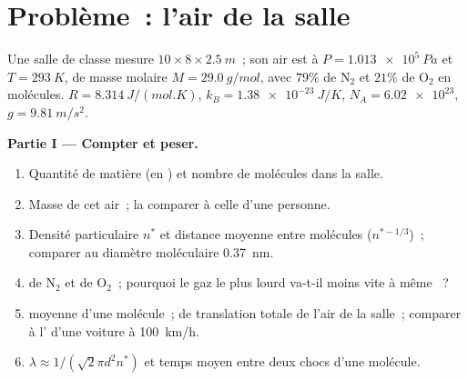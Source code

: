 \section{Problème~: l'air de la salle}

\begin{problem}
\label{pb:b1:kinetic-theory:1}
Une salle de classe mesure $10 \times 8 \times \qty{2.5}{m}$~; son air est
à $P = \qty{1.013e5}{Pa}$ et $T = \qty{293}{K}$, de masse molaire
$M = \qty{29.0}{g/mol}$, avec $79\%$ de N$_2$ et $21\%$ de O$_2$ en
molécules. $R = \qty{8.314}{J/(mol.K)}$,
$k_B = \qty{1.38e-23}{J/K}$, $N_A = \num{6.02e23}$, $g = \qty{9.81}{m/s^2}$.

\medskip
\noindent\textbf{Partie I --- Compter et peser.}
\begin{enumerate}
  \item Quantité de matière (en ) et nombre de molécules dans la salle.
  \item Masse de cet air~; la comparer à celle d'une personne.
  \item Densité particulaire $n^*$ et distance moyenne entre molécules
        ($n^{*-1/3}$)~; comparer au diamètre moléculaire \qty{0.37}{nm}.
  \item {} de N$_2$ et de O$_2$~; pourquoi le gaz
        le plus lourd va-t-il moins vite à même ~?
  \item {} moyenne d'une molécule~;  de
        translation totale de l'air de la salle~; comparer à l' d'une voiture à \qty{100}{km/h}.
  \item {} $\lambda \approx 1/(\sqrt2\pi d^2n^*)$ et
        temps moyen entre deux chocs d'une molécule.
\end{enumerate}


\end{problem}
